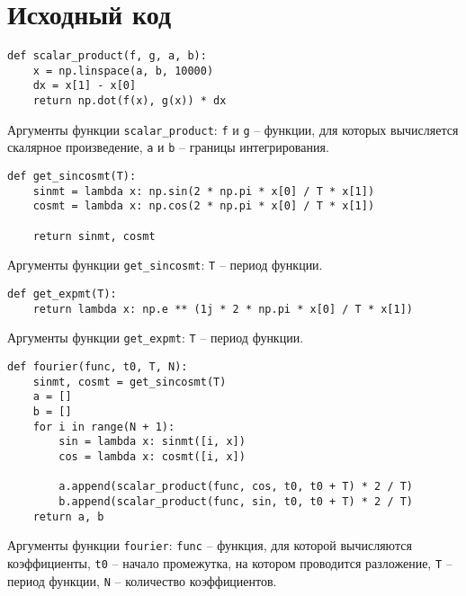 \section{Исходный код}
\label{appendix:source}

\begin{lstlisting}[style=python_white, caption=Функция для вычисления скалярного произведения функций, label=lst:scalar_product]
def scalar_product(f, g, a, b):
    x = np.linspace(a, b, 10000)
    dx = x[1] - x[0]
    return np.dot(f(x), g(x)) * dx
\end{lstlisting}
Аргументы функции \texttt{scalar\_product}: \texttt{f} и \texttt{g} -- функции, для которых вычисляется скалярное произведение, \texttt{a} и \texttt{b} -- границы интегрирования.
\newline

\begin{lstlisting}[style=python_white, caption=Функция для получения вспомогательных функций, label=lst:get_sincosmt]
def get_sincosmt(T):
    sinmt = lambda x: np.sin(2 * np.pi * x[0] / T * x[1])
    cosmt = lambda x: np.cos(2 * np.pi * x[0] / T * x[1])

    return sinmt, cosmt
\end{lstlisting}
Аргументы функции \texttt{get\_sincosmt}: \texttt{T} -- период функции.
\newline

\begin{lstlisting}[style=python_white, caption=Функция для получения вспомогательных функций, label=lst:get_expmt]
def get_expmt(T):
    return lambda x: np.e ** (1j * 2 * np.pi * x[0] / T * x[1])
\end{lstlisting}
Аргументы функции \texttt{get\_expmt}: \texttt{T} -- период функции.
\newline


\begin{lstlisting}[style=python_white, caption=Функция для вычисления коэффициентов Фурье, label=lst:fourier]
def fourier(func, t0, T, N):
    sinmt, cosmt = get_sincosmt(T)
    a = []
    b = []
    for i in range(N + 1):
        sin = lambda x: sinmt([i, x])
        cos = lambda x: cosmt([i, x])

        a.append(scalar_product(func, cos, t0, t0 + T) * 2 / T)
        b.append(scalar_product(func, sin, t0, t0 + T) * 2 / T)
    return a, b
\end{lstlisting}
Аргументы функции \texttt{fourier}: \texttt{func} -- функция, для которой вычисляются коэффициенты, \texttt{t0} -- начало промежутка, на котором проводится разложение, \texttt{T} -- период функции, \texttt{N} -- количество коэффициентов.
\newline

